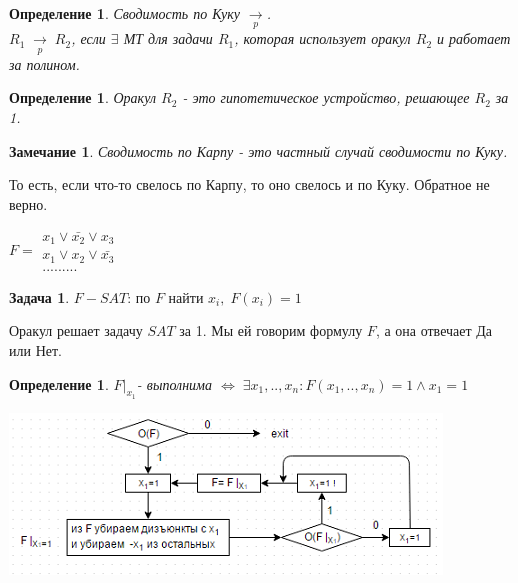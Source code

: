 \documentclass{beamer}
\theoremstyle{plain}
\newtheorem{rmk}[thm]{Замечание}
\newtheorem{dfn}[thm]{Определение}
\theoremstyle{definition}
\newtheorem{prob-rus}[thm]{Задача}
\begin{document}
\begin{frame}
    \begin{dfn}
        Сводимость по Куку $\underset{p}{\rightarrow}$. \\
        $R_{1} \; \underset{p}{\rightarrow} \; R_{2}$, если $\exists$ МТ для задачи $R_{1}$, которая использует оракул $R_{2}$ и работает за полином.
    \end{dfn}
    \begin{dfn}
        Оракул $R_{2}$ - это гипотетическое устройство, решающее $R_{2}$ за 1.
    \end{dfn}
    \begin{rmk}
        Сводимость по Карпу - это частный случай сводимости по Куку.
    \end{rmk}
    То есть, если что-то свелось по Карпу, то оно свелось и по Куку. Обратное не верно.
\end{frame}

\begin{frame}
    $F = \begin{matrix} x_{1} \vee \bar{x_{2}} \vee x_{3} \\ 
    x_{1} \vee x_{2} \vee \bar{x_{3}} \\ ......... \end{matrix}$ \\
    \begin{prob-rus}
        $F-SAT$: по $F$ найти $x_{i}, \; F(x_{i})=1$
    \end{prob-rus}
    Оракул решает задачу $SAT$ за 1. Мы ей говорим формулу $F$, а она отвечает Да или Нет.
    \begin{dfn}
        $F|_{x_{1}}$- выполнима $\Leftrightarrow \; \exists x_{1}, .., x_{n}: F(x_{1}, .., x_{n})=1 \wedge x_{1}=1$
    \end{dfn}
\end{frame}

\begin{frame}
    \includegraphics{scheme1}
\end{frame}
\end{document}
